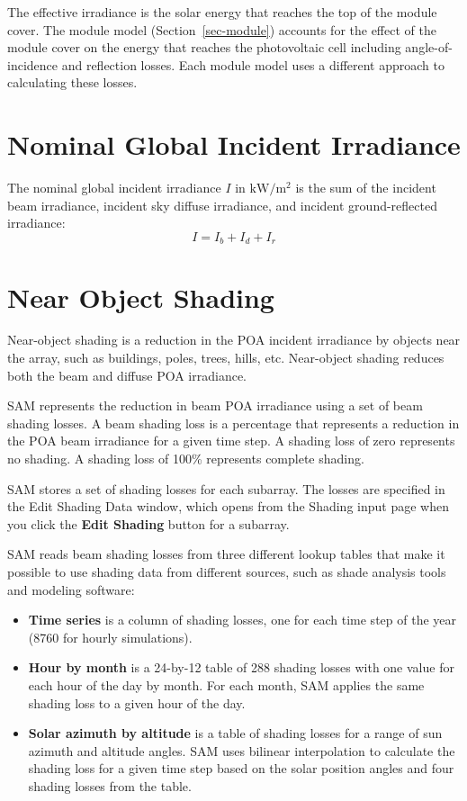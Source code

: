 \documentclass[12pt,letterpaper]{article}
\begin{document}
The effective irradiance is the solar energy that reaches the top of the module cover. The module model (Section~\ref{sec-module}) accounts for the effect of the module cover on the energy that reaches the photovoltaic cell including angle-of-incidence and reflection losses. Each module model uses a different approach to calculating these losses.

\section{Nominal Global Incident Irradiance}\label{sec-nominalincidentirradiance}

The nominal global incident irradiance $I$ in $\mathrm{kW/m^2}$ is the sum of the incident beam irradiance, incident sky diffuse irradiance, and incident ground-reflected irradiance:
\begin{equation}
I = I_{b} + I_{d} + I_{r}
\end{equation}

\section{Near Object Shading}\label{sec-nearobjectshad}

Near-object shading is a reduction in the POA incident irradiance by objects near the array, such as buildings, poles, trees, hills, etc. Near-object shading reduces both the beam and diffuse POA irradiance.

SAM represents the reduction in beam POA irradiance using a set of beam shading losses. A beam shading loss is a percentage that represents a reduction in the POA beam irradiance for a given time step. A shading loss of zero represents no shading. A shading loss of 100\% represents complete shading.

SAM stores a set of shading losses for each subarray. The losses are specified in the Edit Shading Data window, which opens from the Shading input page when you click the \textbf{Edit Shading} button for a subarray.

SAM reads beam shading losses from three different lookup tables that make it possible to use shading data from different sources, such as shade analysis tools and modeling software:
\begin{itemize} 
\item \textbf{Time series} is a column of shading losses, one for each time step of the year (8760 for hourly simulations).
\item \textbf{Hour by month} is a 24-by-12 table of 288 shading losses with one value for each hour of the day by month. For each month, SAM applies the same shading loss to a given hour of the day.
\item \textbf{Solar azimuth by altitude} is a table of shading losses for a range of sun azimuth and altitude angles. SAM uses bilinear interpolation to calculate the shading loss for a given time step based on the solar position angles and four shading losses from the table.
\end{itemize}
\end{document}
